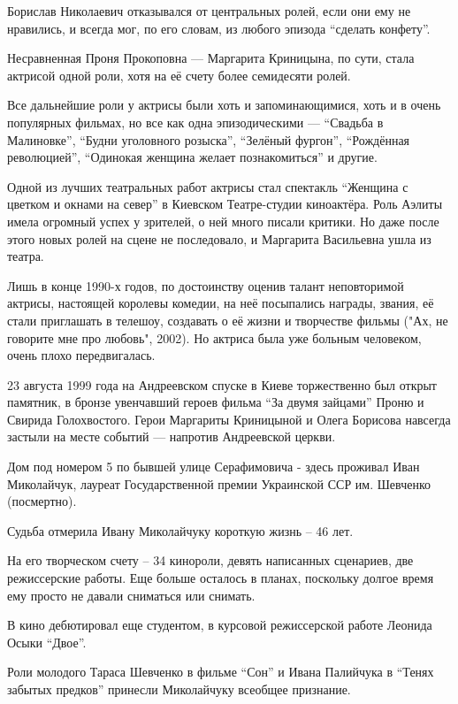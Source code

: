 Борислав Николаевич отказывался от центральных ролей, если они ему не
нравились, и всегда мог, по его словам, из любого эпизода \enquote{сделать конфету}.

Несравненная Проня Прокоповна — Маргарита Криницына, по сути, стала актрисой
одной роли, хотя на её счету более семидесяти ролей.

Все дальнейшие роли у актрисы были хоть и запоминающимися, хоть и в очень
популярных фильмах, но все как одна эпизодическими — \enquote{Свадьба в Малиновке},
\enquote{Будни уголовного розыска}, \enquote{Зелёный фургон}, \enquote{Рождённая революцией}, \enquote{Одинокая
женщина желает познакомиться} и другие.

Одной из лучших театральных работ актрисы стал спектакль \enquote{Женщина с цветком и
окнами на север} в Киевском Театре-студии киноактёра. Роль Аэлиты имела
огромный успех у зрителей, о ней много писали критики. Но даже после этого
новых ролей на сцене не последовало, и Маргарита Васильевна ушла из театра.

Лишь в конце 1990-х годов, по достоинству оценив талант неповторимой актрисы,
настоящей королевы комедии, на неё посыпались награды, звания, её стали
приглашать в телешоу, создавать о её жизни и творчестве фильмы ("Ах, не
говорите мне про любовь", 2002). Но актриса была уже больным человеком, очень
плохо передвигалась.

23 августа 1999 года на Андреевском спуске в Киеве торжественно был открыт
памятник, в бронзе увенчавший героев фильма \enquote{За двумя зайцами} Проню и Свирида
Голохвостого. Герои Маргариты Криницыной и Олега Борисова навсегда застыли на
месте событий — напротив Андреевской церкви.

Дом под номером 5 по бывшей улице Серафимовича - здесь проживал Иван
Миколайчук, лауреат Государственной премии Украинской ССР им. Шевченко
(посмертно).

Судьба отмерила Ивану Миколайчуку короткую жизнь – 46 лет.

На его творческом счету – 34 кинороли, девять написанных сценариев, две
режиссерские работы. Еще больше осталось в планах, поскольку долгое время ему
просто не давали сниматься или снимать. 

В кино дебютировал еще студентом, в курсовой режиссерской работе Леонида Осыки
\enquote{Двое}.

Роли молодого Тараса Шевченко в фильме \enquote{Сон} и Ивана Палийчука в \enquote{Тенях забытых
предков} принесли Миколайчуку всеобщее признание.

